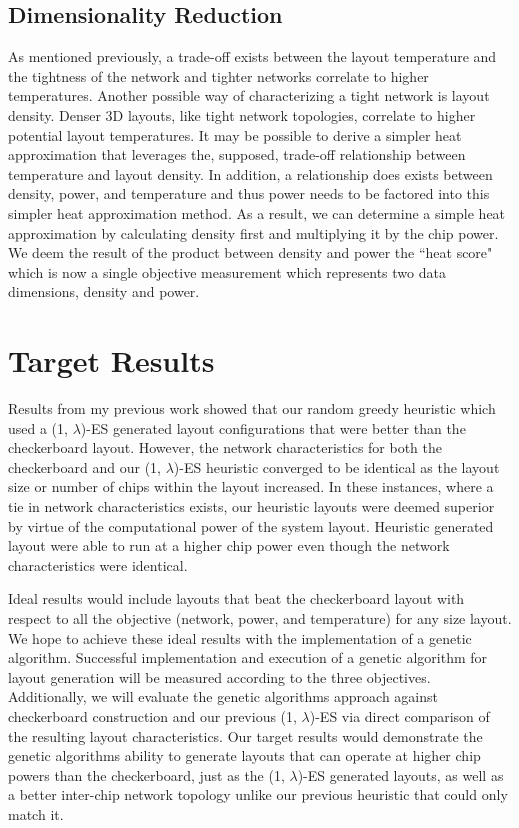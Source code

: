 \subsection{Dimensionality Reduction}
As mentioned previously, a trade-off exists between the layout temperature and
the tightness of the network and tighter networks correlate to higher
temperatures.  Another possible way of characterizing a tight network is layout density.
Denser 3D layouts, like tight network topologies, correlate to higher potential
layout temperatures.  It may be possible to derive a simpler heat approximation
that leverages the, supposed, trade-off relationship between temperature and
layout density.  In addition, a relationship does exists between density, power, and
temperature and thus power needs to be factored into this simpler heat
approximation method. As a result, we can determine a simple heat approximation
by calculating density first and multiplying it by the chip power.  We deem
the result of the product between density and power the ``heat score" which is
now a single objective measurement which represents two data dimensions, density
and power.  

\section{Target Results}

Results from my previous work showed that our random greedy heuristic which used
a (1, $\lambda$)-ES generated layout configurations that were better than the
checkerboard layout.  However, the network characteristics for both the
checkerboard and our (1, $\lambda$)-ES heuristic converged to be identical as
the layout size or number of chips within the layout increased.  In these
instances, where a tie in network characteristics exists, our heuristic layouts
were deemed superior by virtue of the computational power of the system layout.
Heuristic generated layout were able to run at a higher chip power even though
the network characteristics were identical.   

Ideal results would include layouts that beat the checkerboard layout with
respect to all the objective (network, power, and temperature) for any size
layout. We hope to achieve these ideal results with the implementation of a
genetic algorithm.  Successful implementation and execution of a genetic
algorithm for layout generation will be measured according to the three
objectives.  Additionally, we will evaluate the genetic algorithms approach
against checkerboard construction and our previous (1, $\lambda$)-ES via direct
comparison of the resulting layout characteristics. Our target results would
demonstrate the genetic algorithms ability to generate layouts that can operate
at higher chip powers than the checkerboard, just as the (1, $\lambda$)-ES
generated layouts, as well as a better inter-chip network topology unlike our
previous heuristic that could only match it.    


